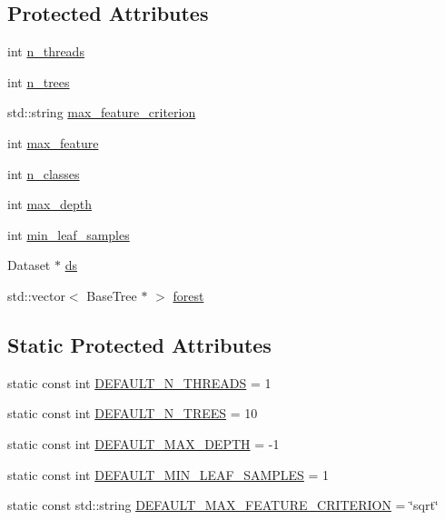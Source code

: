 \subsection*{Protected Attributes}
\begin{DoxyCompactItemize}
\item 
int \hyperlink{class_base_forest_a94fe86e1b426d149a11d100921cea3a4}{n\+\_\+threads}
\item 
int \hyperlink{class_base_forest_a2549a0057ec5419fe1de52ef198125ce}{n\+\_\+trees}
\item 
std\+::string \hyperlink{class_base_forest_a5c651ace1f9d5177cdff38a0ae4048f7}{max\+\_\+feature\+\_\+criterion}
\item 
int \hyperlink{class_base_forest_a07e8b0ed27405f469198f2c4875786c9}{max\+\_\+feature}
\item 
int \hyperlink{class_base_forest_a07e5f38350cc60220dab5661f378b776}{n\+\_\+classes}
\item 
int \hyperlink{class_base_forest_a85cf2e2e202c6e82bf684057181138f6}{max\+\_\+depth}
\item 
int \hyperlink{class_base_forest_a15e0407f3c0fbc4c25e0796c781ff059}{min\+\_\+leaf\+\_\+samples}
\item 
Dataset $\ast$ \hyperlink{class_base_forest_abb0fa17c78f968b583bc15139f409dd5}{ds}
\item 
std\+::vector$<$ Base\+Tree $\ast$ $>$ \hyperlink{class_base_forest_a1a271bf9403c4181aff21e54d1a5e255}{forest}
\end{DoxyCompactItemize}
\subsection*{Static Protected Attributes}
\begin{DoxyCompactItemize}
\item 
static const int \hyperlink{class_base_forest_a36733c1fadd0daadba8e694ee30fd1b6}{D\+E\+F\+A\+U\+L\+T\+\_\+\+N\+\_\+\+T\+H\+R\+E\+A\+D\+S} = 1
\item 
static const int \hyperlink{class_base_forest_a5a697ac9a46154b8f551c012820ffd56}{D\+E\+F\+A\+U\+L\+T\+\_\+\+N\+\_\+\+T\+R\+E\+E\+S} = 10
\item 
static const int \hyperlink{class_base_forest_ac6df44eee4d7ee5913ad57d1d6c79692}{D\+E\+F\+A\+U\+L\+T\+\_\+\+M\+A\+X\+\_\+\+D\+E\+P\+T\+H} = -\/1
\item 
static const int \hyperlink{class_base_forest_a3d000d7f9e2410c73b41b70d8e2e58f8}{D\+E\+F\+A\+U\+L\+T\+\_\+\+M\+I\+N\+\_\+\+L\+E\+A\+F\+\_\+\+S\+A\+M\+P\+L\+E\+S} = 1
\item 
static const std\+::string \hyperlink{class_base_forest_af72e5270729ceae48ca24163a35b46af}{D\+E\+F\+A\+U\+L\+T\+\_\+\+M\+A\+X\+\_\+\+F\+E\+A\+T\+U\+R\+E\+\_\+\+C\+R\+I\+T\+E\+R\+I\+O\+N} = \char`\"{}sqrt\char`\"{}
\end{DoxyCompactItemize}
